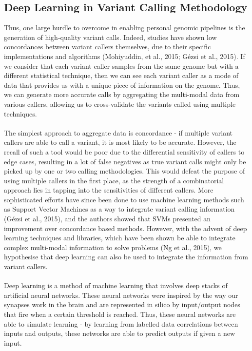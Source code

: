 \documentclass{article}
\begin{document}
\subsection{Deep Learning in Variant Calling Methodology}
Thus, one large hurdle to overcome in enabling personal genomic pipelines is the generation of high-quality variant calls. Indeed, studies have shown low concordances between variant callers themselves, due to their specific implementations and algorithms (Mohiyuddin, et al., 2015; Gézsi et al., 2015). If we consider that each variant caller samples from the same genome but with a different statistical technique, then we can see each variant caller as a mode of data that provides us with a unique piece of information on the genome. Thus, we can generate more accurate calls by aggregating the multi-modal data from various callers, allowing us to cross-validate the variants called using multiple techniques.\\\\
The simplest approach to aggregate data is concordance - if multiple variant callers are able to call a variant, it is most likely to be accurate. However, the recall of such a tool would be poor due to the differential sensitivity of callers to edge cases, resulting in a lot of false negatives as true variant calls might only be picked up by one or two calling methodologies. This would defeat the purpose of using multiple callers in the first place, as the strength of a combinatorial approach lies in tapping into the sensitivities of different callers. More sophisticated efforts have since been done to use machine learning methods such as Support Vector Machines as a way to integrate variant calling information (Gézsi et al., 2015), and the authors showed that SVMs presented an improvement over concordance based methods. However, with the advent of deep learning techniques and libraries, which have been shown be able to integrate complex multi-modal information to solve problems (Ng et al., 2015), we hypothesise that deep learning can also be used to integrate the information from variant callers.\\\\
Deep learning is a method of machine learning that involves deep stacks of artificial neural networks. These neural networks were inspired by the way our synapses work in the brain and are represented in silico by input/output nodes that fire when a certain threshold is reached. Thus, these neural networks are able to simulate learning - by learning from labelled data correlations between inputs and outputs, these networks are able to predict outputs if given a new input. 
\end{document}
